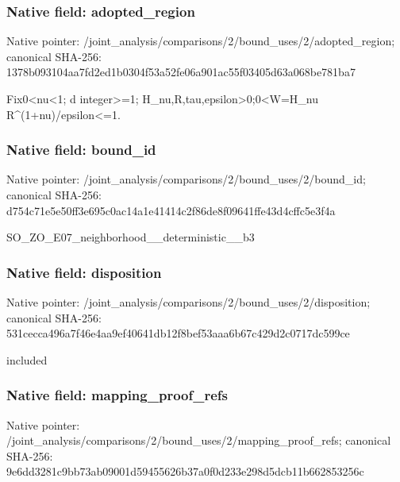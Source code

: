 \documentclass[10pt,a4paper]{article}
\begin{document}
\subsubsection{Native field: adopted\_\allowbreak{}region}
Native pointer: /joint\_\allowbreak{}analysis/comparisons/2/bound\_\allowbreak{}uses/2/adopted\_\allowbreak{}region; canonical SHA-256: 1378b093104aa7fd2ed1b0304f53a52fe06a901ac55f03405d63a068be781ba7

\begingroup\raggedright\sloppy Fix0<nu<1;\allowbreak{} d integer>=\allowbreak{}1;\allowbreak{} H\_\allowbreak{}nu,\allowbreak{}R,\allowbreak{}tau,\allowbreak{}epsilon>0;\allowbreak{}0<W=\allowbreak{}H\_\allowbreak{}nu R\textasciicircum{}(1+nu)/\allowbreak{}epsilon<=\allowbreak{}1.\par\endgroup

\subsubsection{Native field: bound\_\allowbreak{}id}
Native pointer: /joint\_\allowbreak{}analysis/comparisons/2/bound\_\allowbreak{}uses/2/bound\_\allowbreak{}id; canonical SHA-256: d754c71e5e50ff3e695c0ac14a1e41414c2f86de8f09641ffe43d4cffc5e3f4a

\begingroup\raggedright\sloppy SO\_\allowbreak{}ZO\_\allowbreak{}E07\_\allowbreak{}neighborhood\_\allowbreak{}\_\allowbreak{}deterministic\_\allowbreak{}\_\allowbreak{}b3\par\endgroup

\subsubsection{Native field: disposition}
Native pointer: /joint\_\allowbreak{}analysis/comparisons/2/bound\_\allowbreak{}uses/2/disposition; canonical SHA-256: 531cecca496a7f46e4aa9ef40641db12f8bef53aaa6b67c429d2c0717dc599ce

\begingroup\raggedright\sloppy included\par\endgroup

\subsubsection{Native field: mapping\_\allowbreak{}proof\_\allowbreak{}refs}
Native pointer: /joint\_\allowbreak{}analysis/comparisons/2/bound\_\allowbreak{}uses/2/mapping\_\allowbreak{}proof\_\allowbreak{}refs; canonical SHA-256: 9e6dd3281c9bb73ab09001d59455626b37a0f0d233e298d5dcb11b662853256c
\end{document}
